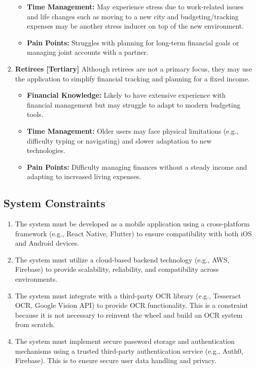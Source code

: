 \documentclass[12pt]{article}
\begin{document}
\begin{enumerate}
\begin{itemize}
			\item \textbf{Time Management:} May experience stress due to work-related issues and life changes such as moving to a new city and budgeting/tracking expenses may be another stress inducer on top of the new environment.
			\item \textbf{Pain Points:} Struggles with planning for long-term financial goals or managing joint accounts with a partner.
		\end{itemize}
	\item \textbf{Retirees [Tertiary]}
		Although retirees are not a primary focus, they may use the application to simplify financial tracking and planning for a fixed income.
		\begin{itemize}
			\item \textbf{Financial Knowledge:} Likely to have extensive experience with financial management but may struggle to adapt to modern budgeting tools.
			\item \textbf{Time Management:} Older users may face physical limitations (e.g., difficulty typing or navigating) and slower adaptation to new technologies.
			\item \textbf{Pain Points:} Difficulty managing finances without a steady income and adapting to increased living expenses.
		\end{itemize}
\end{enumerate}

\newpage

\subsection{System Constraints}


\begin{enumerate}[label=C\arabic*]
  \item The system must be developed as a mobile application using a
  cross-platform framework (e.g., React Native, Flutter) to ensure
  compatibility with both iOS and Android devices.
  \item The system must utilize a cloud-based backend technology (e.g., AWS,
  Firebase) to provide scalability, reliability, and compatibility across
  environments.
  \item The system must integrate with a third-party OCR library (e.g.,
  Tesseract OCR, Google Vision API) to provide OCR functionality. This is a
  constraint because it is not necessary to reinvent the wheel and build an OCR
  system from scratch.
  \item The system must implement secure password storage and authentication
  mechanisms using a trusted third-party authentication service (e.g., Auth0,
  Firebase). This is to ensure secure user data handling and privacy.
\end{enumerate}
\end{document}
